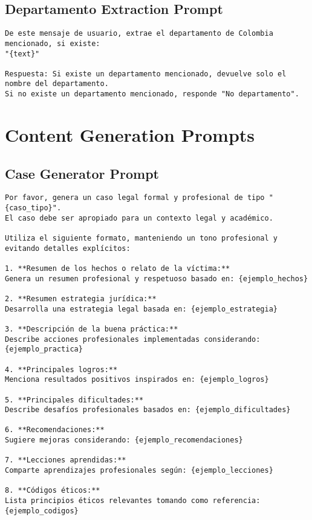 \subsection{Departamento Extraction Prompt}
\label{subsec:departamento-prompt}
\begin{lstlisting}[style=prompt]
De este mensaje de usuario, extrae el departamento de Colombia mencionado, si existe:
"{text}"

Respuesta: Si existe un departamento mencionado, devuelve solo el nombre del departamento.
Si no existe un departamento mencionado, responde "No departamento".
\end{lstlisting}

\section{Content Generation Prompts}
\label{sec:content-gen-prompts}

\subsection{Case Generator Prompt}
\label{subsec:case-gen-prompt}
\begin{lstlisting}[style=prompt]
Por favor, genera un caso legal formal y profesional de tipo "{caso_tipo}". 
El caso debe ser apropiado para un contexto legal y académico.

Utiliza el siguiente formato, manteniendo un tono profesional y evitando detalles explícitos:

1. **Resumen de los hechos o relato de la víctima:**
Genera un resumen profesional y respetuoso basado en: {ejemplo_hechos}

2. **Resumen estrategia jurídica:**
Desarrolla una estrategia legal basada en: {ejemplo_estrategia}

3. **Descripción de la buena práctica:**
Describe acciones profesionales implementadas considerando: {ejemplo_practica}

4. **Principales logros:**
Menciona resultados positivos inspirados en: {ejemplo_logros}

5. **Principales dificultades:**
Describe desafíos profesionales basados en: {ejemplo_dificultades}

6. **Recomendaciones:**
Sugiere mejoras considerando: {ejemplo_recomendaciones}

7. **Lecciones aprendidas:**
Comparte aprendizajes profesionales según: {ejemplo_lecciones}

8. **Códigos éticos:**
Lista principios éticos relevantes tomando como referencia: {ejemplo_codigos}
\end{lstlisting}

